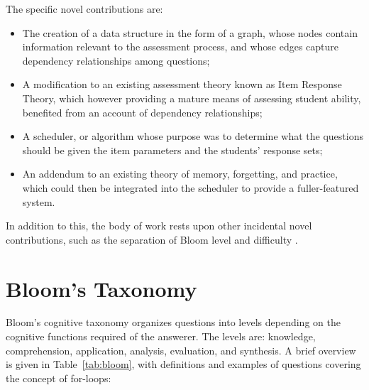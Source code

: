 The specific novel contributions are: 

\begin{itemize}

 \item The creation of a data structure in the form of a graph, whose nodes
 contain information relevant to the assessment process, and whose edges
 capture dependency relationships among questions;

 \item A modification to an existing assessment theory known as Item Response
 Theory, which however providing a mature means of assessing student ability,
 benefited from an account of dependency relationships;
 
 \item A scheduler, or algorithm whose purpose was to determine what the
 questions should be given the item parameters and the students' response
 sets;

 \item An addendum to an existing theory of memory, forgetting, and practice,
 which could then be integrated into the scheduler to provide a fuller-featured
 system.

\end{itemize}

In addition to this, the body of work rests upon other incidental novel
contributions, such as the separation of Bloom level and difficulty
\cite{castleberry2016effect}.

\section{Bloom's Taxonomy}

Bloom's cognitive taxonomy organizes questions into levels depending on the
cognitive functions required of the answerer.  The levels are: knowledge,
comprehension, application, analysis, evaluation, and synthesis.  A brief
overview is given in Table~\ref{tab:bloom}, with definitions and examples of
questions covering the concept of for-loops:

